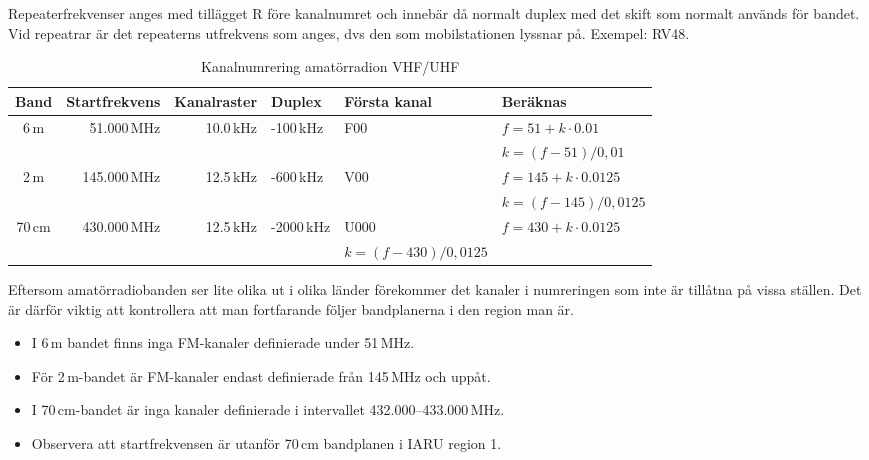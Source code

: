 Repeaterfrekvenser anges med tillägget R före kanalnumret och innebär
då normalt duplex med det skift som normalt används för bandet. Vid
repeatrar är det repeaterns utfrekvens som anges, dvs den som
mobilstationen lyssnar på. Exempel: RV48.

\begin{table}[h]
\centering
\begin{tabular}{crrlll}
	\textbf{Band} & \textbf{Startfrekvens} & \textbf{Kanalraster} & \textbf{Duplex} & \textbf{Första kanal} & \textbf{Beräknas}    \\ \hline
	    6\,m      &            51.000\,MHz &            10.0\,kHz & -100\,kHz       & F00                   & $f=51+k\cdot0.01$    \\
	              &                        &                      &                 &                       & $k=(f-51)/0,01$      \\ \hline
	    2\,m      &           145.000\,MHz &            12.5\,kHz & -600\,kHz       & V00                   & $f=145+k\cdot0.0125$ \\
	              &                        &                      &                 &                       & $k=(f-145)/0,0125$   \\ \hline
	   70\,cm     &           430.000\,MHz &            12.5\,kHz & -2000\,kHz      & U000                  & $f=430+k\cdot0.0125$ \\
	                                       &                      &                 &                       & $k=(f-430)/0,0125$   \\ \hline
\end{tabular}
\caption{Kanalnumrering amatörradion VHF/UHF}
\end{table}

Eftersom amatörradiobanden ser lite olika ut i olika länder förekommer det
kanaler i numreringen som inte är tillåtna på vissa ställen. Det är därför
viktig att kontrollera att man fortfarande följer bandplanerna i den region
man är.

\begin{itemize}
\item I 6\,m bandet finns inga FM-kanaler definierade under 51\,MHz.
\item För 2\,m-bandet är FM-kanaler endast definierade från 145\,MHz och
uppåt.
\item I 70\,cm-bandet är inga kanaler definierade i intervallet
432.000--433.000\,MHz.
\item Observera att startfrekvensen är utanför 70\,cm
bandplanen i IARU region 1.
\end{itemize}

